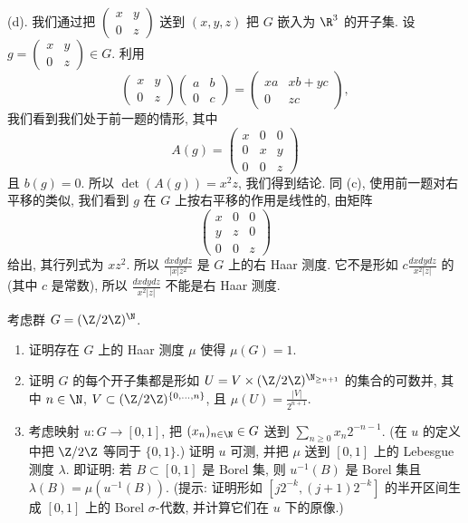\begin{solution}
(d). 我们通过把 $\begin{pmatrix} x & y \\ 0 & z \end{pmatrix}$ 送到 $(x, y, z)$ 把 $G$ 嵌入为 $\R^3$ 的开子集. 设 $g = \begin{pmatrix} x & y \\ 0 & z \end{pmatrix} \in G$. 利用
\[
\begin{pmatrix} x & y \\ 0 & z \end{pmatrix}\begin{pmatrix} a & b \\ 0 & c \end{pmatrix} = \begin{pmatrix} xa & xb + yc \\ 0 & zc \end{pmatrix},
\]
我们看到我们处于前一题的情形, 其中
\[
A(g) = \begin{pmatrix} x & 0 & 0 \\ 0 & x & y \\ 0 & 0 & z \end{pmatrix}
\]
且 $b(g) = 0$. 所以 $\det(A(g)) = x^2z$, 我们得到结论.
同 (c), 使用前一题对右平移的类似, 我们看到 $g$ 在 $G$ 上按右平移的作用是线性的, 由矩阵
\[
\begin{pmatrix} x & 0 & 0 \\ y & z & 0 \\ 0 & 0 & z \end{pmatrix}
\]
给出, 其行列式为 $xz^2$. 所以 $\frac{dxdydz}{|x|z^2}$ 是 $G$ 上的右 Haar 测度. 它不是形如 $c\frac{dxdydz}{x^2|z|}$ 的 (其中 $c$ 是常数), 所以 $\frac{dxdydz}{x^2|z|}$ 不能是右 Haar 测度.
\end{solution}

\begin{exercise}[$(\Z/2\Z)^{\N}$ 的 Haar 测度]
\label{ex:I.5.3.3}
考虑群 $G = (\Z/2\Z)^{\N}$.
\begin{enumerate}
\item[(a)] 证明存在 $G$ 上的 Haar 测度 $\mu$ 使得 $\mu(G) = 1$.
\item[(b)] 证明 $G$ 的每个开子集都是形如 $U = V \times (\Z/2\Z)^{\N_{\geq n+1}}$ 的集合的可数并, 其中 $n \in \N$, $V \subset (\Z/2\Z)^{\{0,\ldots,n\}}$, 且 $\mu(U) = \frac{|V|}{2^{n+1}}$.
\item[(c)] 考虑映射 $u \colon G \to [0,1]$, 把 $(x_n)_{n \in \N} \in G$ 送到 $\sum_{n \geq 0}x_n2^{-n-1}$. (在 $u$ 的定义中把 $\Z/2\Z$ 等同于 $\{0,1\}$.) 证明 $u$ 可测, 并把 $\mu$ 送到 $[0,1]$ 上的 Lebesgue 测度 $\lambda$. 即证明: 若 $B \subset [0,1]$ 是 Borel 集, 则 $u^{-1}(B)$ 是 Borel 集且 $\lambda(B) = \mu(u^{-1}(B))$. (提示: 证明形如 $[j2^{-k}, (j+1)2^{-k}]$ 的半开区间生成 $[0,1]$ 上的 Borel $\sigma$-代数, 并计算它们在 $u$ 下的原像.)
\end{enumerate}
\end{exercise}

